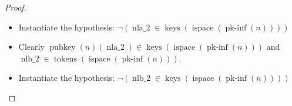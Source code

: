 \documentclass[11pt]{article}
\theoremstyle{plain}
\begin{document}
\begin{proof}
\begin{itemize}[leftmargin=2.8em, itemsep=4pt, parsep=1pt]
\begin{itemize}[leftmargin=2.8em, itemsep=4pt, parsep=1pt]
\begin{equation*}
\begin{array}{@{}l@{}}
\operatorname{nla\_2} \in \operatorname{names}(n) \\
\operatorname{nlb\_2} \in \operatorname{names}(n) \\
\operatorname{nlm\_2} \in \operatorname{tokens}(\operatorname{ispace}(\operatorname{pk\text{-}inf}(n))) \\
\operatorname{nln\_2} \in \operatorname{tokens}(\operatorname{ispace}(\operatorname{pk\text{-}inf}(n))) \\
\neg (\operatorname{nln\_2} \in \operatorname{names}(n)) \\
\neg (\operatorname{nlm\_2} \in \operatorname{keys}(\operatorname{ispace}(\operatorname{pk\text{-}inf}(n)))) \\
\begin{array}{@{}l@{}} \operatorname{strand\text{-}map}(\operatorname{ispace}(\operatorname{pk\text{-}inf}(n)))(\operatorname{nth}(2, m)) \\ =\; \langle \langle \mathit{received}, \operatorname{encr}(\operatorname{lst}(\langle \operatorname{nlm\_2}, \operatorname{nla\_2} \rangle), \operatorname{pubkey}(n)(\operatorname{nlb\_2})) \rangle, \langle \mathit{sent}, \operatorname{encr}(\operatorname{lst}(\langle \operatorname{nlm\_2}, \operatorname{nln\_2}, \operatorname{nlb\_2} \rangle), \operatorname{pubkey}(n)(\operatorname{nla\_2})) \rangle, \langle \mathit{received}, \operatorname{encr}(\operatorname{nln\_2}, \operatorname{pubkey}(n)(\operatorname{nlb\_2})) \rangle \rangle \end{array} \\
\neg (\operatorname{nln\_2} \in \operatorname{keys}(\operatorname{ispace}(\operatorname{pk\text{-}inf}(n))))
\end{array}
\end{equation*}
Clearly $\operatorname{nla\_2} \in \operatorname{tokens}(\operatorname{ispace}(\operatorname{pk\text{-}inf}(n)))$.
  \item[\textbf{467}] Instantiate the hypothesis: $\neg (\operatorname{nla\_2} \in \operatorname{keys}(\operatorname{ispace}(\operatorname{pk\text{-}inf}(n))))$
  \item[\textbf{468--469}] Clearly $\operatorname{pubkey}(n)(\operatorname{nla\_2}) \in \operatorname{keys}(\operatorname{ispace}(\operatorname{pk\text{-}inf}(n)))$ and $\operatorname{nlb\_2} \in \operatorname{tokens}(\operatorname{ispace}(\operatorname{pk\text{-}inf}(n)))$.
  \item[\textbf{470}] Instantiate the hypothesis: $\neg (\operatorname{nlb\_2} \in \operatorname{keys}(\operatorname{ispace}(\operatorname{pk\text{-}inf}(n))))$

\end{itemize}
\end{itemize}
\end{proof}
\end{document}
